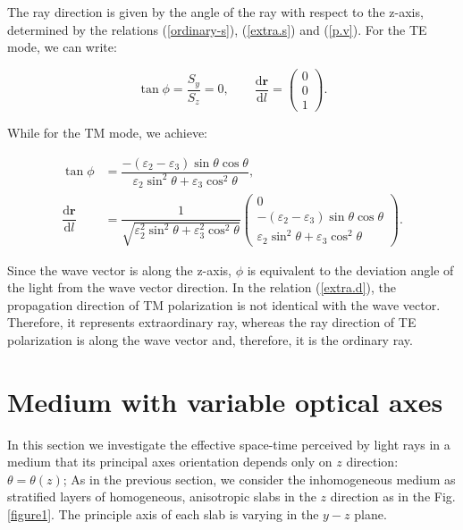\documentclass[9pt,twocolumn,twoside]{osajnl}
\begin{document}
 The ray direction is given by the angle of the ray with respect to the z-axis, determined  by the relations (\ref{ordinary-s}), (\ref{extra.s}) and (\ref{p.v}).
 For the TE mode, we can write:

 \begin{equation}\label{ordinary-d}
\tan{\phi}=\dfrac{S_{y}}{S_{z}}=0, \qquad \dfrac{\mathbf{\mathrm{d}{r}}}{\mathrm{d}{l}}=
 \begin{pmatrix}
 0\\0\\1
 \end{pmatrix}.
\end{equation}

While for the TM mode, we achieve:

\begin{equation}\label{extra.d}\begin{split}
\tan\phi & =\dfrac{-(\varepsilon_{2}-\varepsilon_{3})\sin{\theta}\cos{\theta}}{\varepsilon_{2} \sin^{2}{\theta} + \varepsilon_{3}\cos^{2}{\theta}},\\
 \dfrac{\mathbf{\mathrm{d}{r}}}{\mathrm{d}{l}} & =\dfrac{1}{\sqrt{\varepsilon_{2}^{2} \sin^{2}{\theta} + \varepsilon_{3}^{2}\cos^{2}{\theta}}}
 \begin{pmatrix}
 0\\ -(\varepsilon_{2}-\varepsilon_{3})\sin{\theta}\cos{\theta}  \\  \varepsilon_{2} \sin^{2}{\theta} + \varepsilon_{3}\cos^{2}{\theta}
 \end{pmatrix}.
\end{split}\end{equation}

Since the wave vector is along the z-axis, $\phi$ is equivalent to the deviation angle of the light from the wave vector direction.
In the relation (\ref{extra.d}), the propagation direction of TM polarization is not identical with the wave vector. Therefore, it represents extraordinary ray, whereas the ray direction of TE polarization is along the wave vector and, therefore, it is the ordinary ray. 

 
\section{Medium with variable optical axes}\label{m.v}

In this section we investigate the effective space-time perceived by light rays in a medium that its principal axes orientation depends only on $z$ direction: $\theta=\theta(z)$;
As in the previous section, we consider the inhomogeneous medium as stratified layers of homogeneous, anisotropic slabs in the $z$ direction as in the  Fig. \ref{figure1}. The principle axis of each slab is varying in the $y-z$ plane. 
\end{document}
